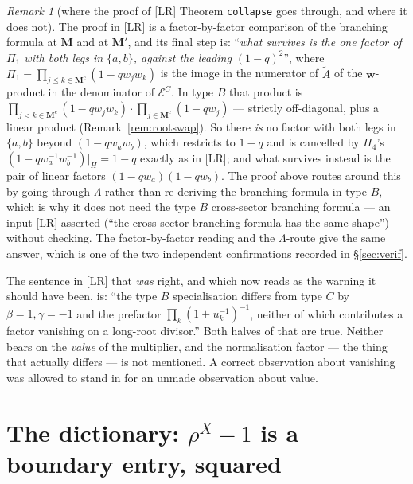 \documentclass[11pt]{article}
\theoremstyle{plain}
\theoremstyle{definition}
\theoremstyle{remark}
\newtheorem{rem}[thm]{Remark}
\theoremstyle{plain}
\newcommand{\bM}{\mathbf{M}}
\newcommand{\bw}{\mathbf{w}}
\newcommand{\At}{\widetilde{A}}
\begin{document}
\begin{rem}[where the proof of {[LR]} Theorem \texttt{collapse} goes through, and
where it does not]\label{rem:reproof}
The proof in [LR] is a factor-by-factor comparison of the branching formula at
$\bM$ and at $\bM'$, and its final step is: ``\emph{what survives is the one
factor of $\Pi_1$ with both legs in $\{a,b\}$, against the leading
$(1-q)^2$}'', where $\Pi_1=\prod_{j\le k\in\bM^{\mathrm{c}}}(1-qw_jw_k)$ is the
image in the numerator of $\At$ of the $\bw$-product in the denominator of
$\mathcal{E}^C$.  In type $B$ that product is
$\prod_{j<k\in\bM^{\mathrm{c}}}(1-qw_jw_k)\cdot\prod_{j\in\bM^{\mathrm{c}}}(1-qw_j)$
--- strictly off-diagonal, plus a linear product (Remark~\ref{rem:rootswap}).
So there \emph{is} no factor with both legs in $\{a,b\}$ beyond
$(1-qw_aw_b)$, which restricts to $1-q$ and is cancelled by $\Pi_4$'s
$(1-qw_a^{-1}w_b^{-1})|_H=1-q$ exactly as in [LR]; and what survives instead is
the pair of linear factors $(1-qw_a)(1-qw_b)$.  The proof above routes around
this by going through $\Lambda$ rather than re-deriving the branching formula in
type $B$, which is why it does not need the type $B$ cross-sector branching
formula --- an input [LR] asserted (``the cross-sector branching formula has the
same shape'') without checking.  The factor-by-factor reading and the
$\Lambda$-route give the same answer, which is one of the two independent
confirmations recorded in \S\ref{sec:verif}.

The sentence in [LR] that \emph{was} right, and which now reads as the warning it
should have been, is: ``the type $B$ specialisation differs from type $C$ by
$\beta=1,\gamma=-1$ and the prefactor $\prod_k(1+u_k^{-1})^{-1}$, neither of
which contributes a factor vanishing on a long-root divisor.''  Both halves of
that are true.  Neither bears on the \emph{value} of the multiplier, and the
normalisation factor --- the thing that actually differs --- is not mentioned.
A correct observation about vanishing was allowed to stand in for an unmade
observation about value.
\end{rem}

\section{The dictionary: \texorpdfstring{$\rho^X-1$}{rho-1} is a boundary entry, squared}
\label{sec:dict}
\end{document}
